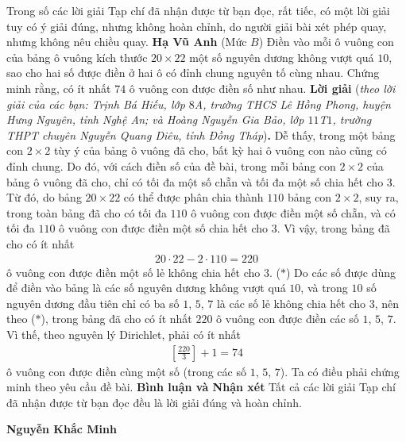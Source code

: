 \begin{multicols}{2}
	\vskip 0.05cm
	Trong số các lời giải Tạp chí đã nhận được từ bạn đọc, rất tiếc, có một lời giải tuy có ý giải đúng, nhưng không hoàn chỉnh, do người giải bài xét phép quay, nhưng không nêu chiều quay.
	\vskip 0.05cm
	\hfill	\textbf{\color{thachthuctoanhoc}Hạ Vũ Anh}
	\vskip 0.05cm
	{}
	(Mức $B$) Điền vào mỗi ô vuông con của bảng ô vuông kích thước $20\times 22$ một số nguyên dương không vượt quá $10$, sao cho hai số được điền ở hai ô có đỉnh chung nguyên tố cùng nhau. Chứng minh rằng, có ít nhất $74$ ô vuông con được điền số như nhau.
	\vskip 0.05cm
	\textbf{\color{thachthuctoanhoc}Lời giải} (\textit{theo lời giải của các bạn: Trịnh Bá Hiếu, lớp $8$A, trường THCS Lê Hồng Phong, huyện Hưng Nguyên, tỉnh Nghệ An; và Hoàng Nguyễn Gia Bảo, lớp $11$T$1$, trường THPT chuyên Nguyễn Quang Diêu, tỉnh Đồng Tháp})\textbf{\color{thachthuctoanhoc}.}
	\vskip 0.05cm
	Dễ thấy, trong một bảng con $2 \times 2$ tùy ý của bảng ô vuông đã cho, bất kỳ hai ô vuông con nào cũng có đỉnh chung. Do đó, với cách điền số của đề bài, trong mỗi bảng con $2 \times 2$ của bảng ô vuông đã cho, chỉ có tối đa một số chẵn và tối đa một số chia hết cho $3$.
	\vskip 0.05cm
	Từ đó, do bảng $20 \times 22$ có thể được phân chia thành $110$ bảng con $2 \times 2$, suy ra, trong toàn bảng đã cho có tối đa $110$ ô vuông con được điền một số chẵn, và có tối đa $110$ ô vuông con được điền một số chia hết cho $3$. Vì vậy, trong bảng đã cho có ít nhất
	\begin{align*}
		20 \cdot 22 - 2 \cdot 110 = 220
	\end{align*}
	ô vuông con được điền một số lẻ không chia hết cho $3$. \hfill ($*$)
	\vskip 0.05cm
	Do các số được dùng để điền vào bảng là các số nguyên dương không vượt quá $10$, và trong $10$ số nguyên dương đầu tiên chỉ có ba số $1$, $5$, $7$ là các số lẻ không chia hết cho $3$, nên theo ($*$), trong bảng đã cho có ít nhất $220$ ô vuông con được điền các số $1$, $5$, $7$. Vì thế, theo nguyên lý Dirichlet, phải có ít nhất
	\begin{align*}
		\left[ {\frac{{220}}{3}} \right] + 1 = 74
	\end{align*}
	ô vuông con được điền cùng một số (trong các số $1$, $5$, $7$).
	\vskip 0.05cm
	Ta có điều phải chứng minh theo yêu cầu đề bài.
	\vskip 0.05cm
	\textbf{\color{thachthuctoanhoc}Bình luận và Nhận xét}
	\vskip 0.05cm
	Tất cả các lời giải Tạp chí đã nhận được từ bạn đọc đều là lời giải đúng và hoàn chỉnh.
	\begin{flushright}
		\textbf{\color{thachthuctoanhoc}Nguyễn Khắc Minh}

\end{flushright}
\end{multicols}
